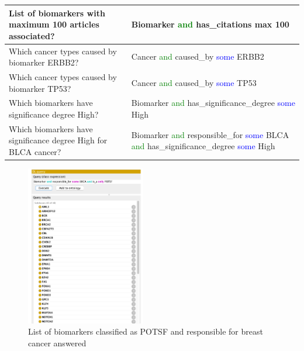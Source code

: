 \begin{table}
\begin{center}
\begin{tabular}{l|l}
                List of biomarkers with maximum 100 articles associated? & Biomarker \textcolor{green}{and} has\_citations max 100 \\\hline
                Which cancer types caused by biomarker ERBB2? & Cancer \textcolor{green}{and} caused\_by \textcolor{blue}{some} ERBB2 \\\hline
                Which cancer types caused by biomarker TP53? & Cancer \textcolor{green}{and} caused\_by \textcolor{blue}{some} TP53 \\\hline
                Which biomarkers have significance degree High? & Biomarker \textcolor{green}{and} has\_significance\_degree \textcolor{blue}{some} High \\\hline
                Which biomarkers have significance degree High for BLCA cancer? & Biomarker \textcolor{green}{and} responsible\_for \textcolor{blue}{some} BLCA \textcolor{green}{and} has\_significance\_degree \textcolor{blue}{some} High \\\hline
        \end{tabular}
        \vspace{-2mm}
    \end{center}
\end{table}

\begin{figure}
	\centering
	\includegraphics[width=0.45\linewidth,height=70mm]{images/sample_q_a.png}
	\caption{List of biomarkers classified as POTSF and responsible for breast cancer answered}
	\label{fig:sample_q_a}
	\vspace{-2mm}
\end{figure}


